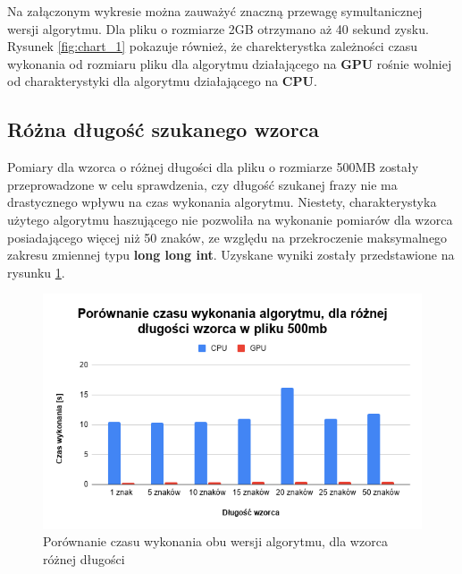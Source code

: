 Na załączonym wykresie można zauważyć znaczną przewagę symultanicznej wersji algorytmu. Dla pliku o rozmiarze 2GB otrzymano aż 40 sekund zysku. Rysunek \ref{fig:chart_1} pokazuje również, że charekterystka zależności czasu wykonania od rozmiaru pliku dla algorytmu działającego na \textbf{GPU} rośnie wolniej od charakterystyki dla algorytmu działającego na \textbf{CPU}.

\subsection{Różna długość szukanego wzorca}

Pomiary dla wzorca o różnej długości dla pliku o rozmiarze 500MB zostały przeprowadzone w celu sprawdzenia, czy długość szukanej frazy nie ma drastycznego wpływu na czas wykonania algorytmu. Niestety, charakterystyka użytego algorytmu haszującego nie pozwoliła na wykonanie pomiarów dla wzorca posiadającego więcej niż 50 znaków, ze względu na przekroczenie maksymalnego zakresu zmiennej typu \textbf{long long int}. Uzyskane wyniki zostały przedstawione na rysunku \ref{fig:chart_2}.


\begin{figure}[H]
    \centering
    \includegraphics[width=\linewidth]{images/wykres42.png}
    \caption{Porównanie czasu wykonania obu wersji algorytmu, dla wzorca różnej długości}
    \label{fig:chart_2}
\end{figure}

